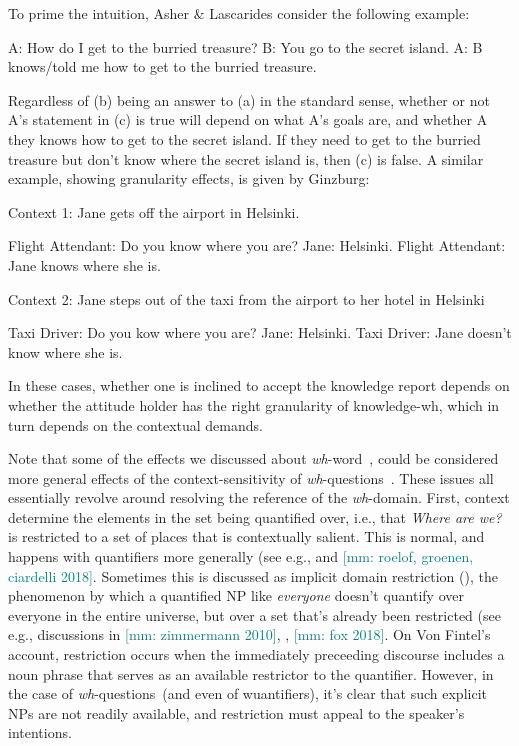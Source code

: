 \documentclass[12pt,letterpaper,table,svgnames,dvipsnames]{article}
\newcommand{\mm}[1]{\textcolor{teal}{[mm: #1]}}
\newcommand{\whqs}{\emph{wh}-questions~}
\newcommand{\whw}{\emph{wh}-word~}
\begin{document}
To prime the intuition, Asher \& Lascarides consider the following example:
\begin{exe}
    \ex 
    \begin{xlist}
        \ex A: How do I get to the burried treasure?
        \ex B: You go to the secret island.
        \ex A: B knows/told me how to get to the burried treasure.
    \end{xlist}
\end{exe}
Regardless of (b) being an answer to (a) in the standard sense, whether or not A's statement in (c) is true will depend on what A's goals are, and whether A they knows how to get to the secret island. If they need to get to the burried treasure but don't know where the secret island is, then (c) is false. A similar example, showing granularity effects, is given by Ginzburg:
\begin{exe}
    \ex Context 1: Jane gets off the airport in Helsinki.
    \begin{xlist}
        \ex Flight Attendant: Do you know where you are?
        \ex Jane: Helsinki.
        \ex Flight Attendant: Jane knows where she is.
    \end{xlist}
    \ex Context 2: Jane steps out of the taxi from the airport to her hotel in Helsinki
    \begin{xlist}
        \ex Taxi Driver: Do you kow where you are?
        \ex Jane: Helsinki.
        \ex Taxi Driver: Jane doesn't know where she is.
    \end{xlist}
\end{exe}
In these cases, whether one is inclined to accept the knowledge report depends on whether the attitude holder has the right granularity of knowledge-wh, which in turn depends on the contextual demands. 

Note that some of the effects we discussed about \whw, could be considered more general effects of the context-sensitivity of \whqs. These issues all essentially revolve around resolving the reference of the \emph{wh}-domain. First, context determine the elements in the set being quantified over, i.e., that \emph{Where are we?} is restricted to a set of places that is contextually salient. This is normal, and happens with quantifiers more generally (see e.g., \cite{lasersohn1999} and \mm{roelof, groenen, ciardelli 2018}. Sometimes this is discussed as implicit domain restriction (\cite{vonfintel1994}), the phenomenon by which a quantified NP like \emph{everyone} doesn't quantify over everyone in the entire universe, but over a set that's already been restricted (see e.g., discussions in \mm{zimmermann 2010}, \cite{george2011}, \mm{fox 2018}. On Von Fintel's account, restriction occurs when the immediately preceeding discourse includes a noun phrase that serves as an available restrictor to the quantifier. However, in the case of \whqs (and even of wuantifiers), it's clear that such explicit NPs are not readily available, and restriction must appeal to the speaker's intentions.
\end{document}
